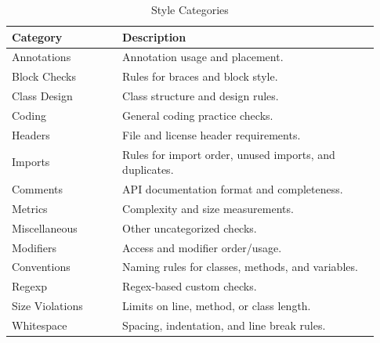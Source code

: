 \begin{table}[h]
\centering
\caption{Style Categories}
\label{tab:style_categories}
\renewcommand{\arraystretch}{1.1}
\small
\begin{tabular}{p{0.28\linewidth} p{0.65\linewidth}}
\hline
\textbf{Category} & \textbf{Description} \\ \hline
Annotations & Annotation usage and placement. \\
Block Checks & Rules for braces and block style. \\
Class Design & Class structure and design rules. \\
Coding & General coding practice checks. \\
Headers & File and license header requirements. \\
Imports & Rules for import order, unused imports, and duplicates. \\
Comments & API documentation format and completeness. \\
Metrics & Complexity and size measurements. \\
Miscellaneous & Other uncategorized checks. \\
Modifiers & Access and modifier order/usage. \\
Conventions & Naming rules for classes, methods, and variables. \\
Regexp & Regex-based custom checks. \\
Size Violations & Limits on line, method, or class length. \\
Whitespace & Spacing, indentation, and line break rules. \\ \hline
\end{tabular}
\end{table}
